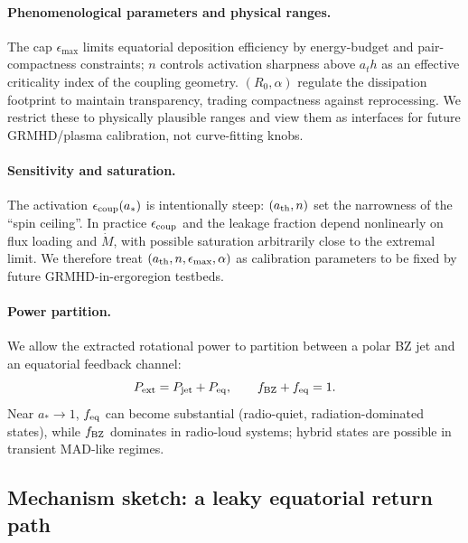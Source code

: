 \documentclass[twocolumn]{aastex701}
\newcommand{\ath}{a_{\rm th}}
\newcommand{\rg}{r_g}
\newcommand{\LEdd}{L_{\rm Edd}}
\newcommand{\Ltot}{L_{\rm tot}}
\newcommand{\FeKa}{\mathrm{Fe\,K}\alpha}
\def\ath{a_th}\def\rg{r_g}\def\LEdd{L_Edd}\def\Ltot{L_tot}\def\FeKa{Fe K\string\alpha}%
\begin{document}
\paragraph{Phenomenological parameters and physical ranges.}
The cap $\epsilon_{\max}$ limits equatorial deposition efficiency by energy-budget and pair-compactness constraints; $n$ controls activation sharpness above $\ath$ as an effective criticality index of the coupling geometry. $(R_0,\alpha)$ regulate the dissipation footprint to maintain transparency, trading compactness against reprocessing. We restrict these to physically plausible ranges and view them as interfaces for future GRMHD/plasma calibration, not curve-fitting knobs.
\paragraph{Sensitivity and saturation.}
The activation $\epsilon_{\rm coup}(a_*)$ is intentionally steep: $(a_{\rm th},n)$ set the narrowness of the “spin ceiling”. In practice $\epsilon_{\rm coup}$ and the leakage fraction depend nonlinearly on flux loading and $\dot M$, with possible saturation arbitrarily close to the extremal limit. We therefore treat $(a_{\rm th},n,\epsilon_{\max},\alpha)$ as calibration parameters to be fixed by future GRMHD-in-ergoregion testbeds.


\paragraph{Power partition.}
We allow the extracted rotational power to partition between a polar BZ jet and an equatorial feedback channel:
\[
P_{\rm ext}=P_{\rm jet}+P_{\rm eq},\qquad f_{\rm BZ}+f_{\rm eq}=1.
\]
Near $a_*\!\to\!1$, $f_{\rm eq}$ can become substantial (radio-quiet, radiation-dominated states), while $f_{\rm BZ}$ dominates in radio-loud systems; hybrid states are possible in transient MAD-like regimes.
\subsection{Mechanism sketch: a leaky equatorial return path}\label{sec:mech-sketch}
\end{document}
